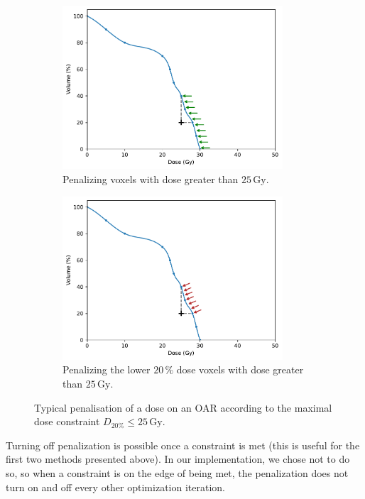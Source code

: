 \begin{figure}
\begin{subfigure}{0.32\textwidth}
		\centering
		\includegraphics[width=0.9\textwidth]{constraint_penalisation_plot_2.pdf}
		\caption{Penalizing voxels with dose greater than $25\,\text{Gy}$.}
		\label{fig:constraint_penalisation_plot_2}
	\end{subfigure}
	\begin{subfigure}{0.32\textwidth}
		\centering
		\includegraphics[width=0.9\textwidth]{constraint_penalisation_plot_3.pdf}
		\caption{Penalizing the lower $20\,\%$ dose voxels with dose greater than $25\,\text{Gy}$.}
		\label{fig:constraint_penalisation_plot_3}
	\end{subfigure}
	\caption{Typical penalisation of a dose on an OAR according to the maximal dose constraint $D_{20\%} \leq 25\,\text{Gy}$.}
	\label{fig:constraint_penalisation}
\end{figure}

Turning off penalization is possible once a constraint is met (this is useful for the first two methods presented above).
In our implementation, we chose not to do so, so when a constraint is on the edge of being met, the penalization does not turn on and off every other optimization iteration.

